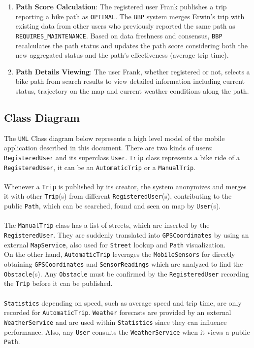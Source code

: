 \begin{enumerate}
    \item \textbf{Path Score Calculation}: The registered user Frank publishes a trip reporting a bike path as \texttt{OPTIMAL}. The \texttt{BBP} system merges Erwin's trip with existing data from other users who previously reported the same path as \texttt{REQUIRES\_MAINTENANCE}. Based on data freshness and consensus, \texttt{BBP} recalculates the path status and updates the path score considering both the new aggregated status and the path's effectiveness (average trip time).

    \item \textbf{Path Details Viewing}: The user Frank, whether registered or not, selects a bike path from search results to view detailed information including current status, trajectory on the map and current weather conditions along the path.
    
\end{enumerate}


\subsection{Class Diagram}
\label{sec:class_diagram}

The \texttt{UML} Class diagram below represents a high level model of the mobile application described in this document. There are two kinds of users: \texttt{RegisteredUser} and its superclass \texttt{User}. \texttt{Trip} class represents a bike ride of a \texttt{RegisteredUser}, it can be an \texttt{AutomaticTrip} or a \texttt{ManualTrip}. \\\\
Whenever a \texttt{Trip} is published by its creator, the system anonymizes and merges it with other \texttt{Trip}(s) from different \texttt{RegisteredUser}(s), contributing to the public \texttt{Path}, which can be searched, found and seen on map by \texttt{User}(s). 
\\\\
The \texttt{ManualTrip} class has a list of streets, which are inserted by the \texttt{RegisteredUser}. They are suddenly translated into \texttt{GPSCoordinates} by using an external \texttt{MapService}, also used for \texttt{Street} lookup and \texttt{Path} visualization. \\
On the other hand, \texttt{AutomaticTrip} leverages the \texttt{MobileSensors} for directly obtaining \texttt{GPSCoordinates} and \texttt{SensorReadings} which are analyzed to find the \texttt{Obstacle}(s). Any \texttt{Obstacle} must be confirmed by the \texttt{RegisteredUser} recording the \texttt{Trip} before it can be published.
\\\\
\texttt{Statistics} depending on speed, such as average speed and trip time, are only recorded for \texttt{AutomaticTrip}. \texttt{Weather} forecasts are provided by an external \texttt{WeatherService} and are used within \texttt{Statistics} since they can influence performance. Also, any \texttt{User} consults the \texttt{WeatherService} when it views a public \texttt{Path}.

